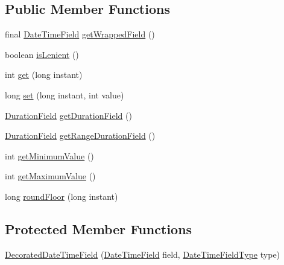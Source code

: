 \subsection*{Public Member Functions}
\begin{DoxyCompactItemize}
\item 
final \hyperlink{classorg_1_1joda_1_1time_1_1_date_time_field}{Date\-Time\-Field} \hyperlink{classorg_1_1joda_1_1time_1_1field_1_1_decorated_date_time_field_aa57cf514485795da7b838d0c8986c545}{get\-Wrapped\-Field} ()
\item 
boolean \hyperlink{classorg_1_1joda_1_1time_1_1field_1_1_decorated_date_time_field_a6123c943d6b22028bd8b2e808929369c}{is\-Lenient} ()
\item 
int \hyperlink{classorg_1_1joda_1_1time_1_1field_1_1_decorated_date_time_field_a16c65d5fd974660e6f23ad75261ee51f}{get} (long instant)
\item 
long \hyperlink{classorg_1_1joda_1_1time_1_1field_1_1_decorated_date_time_field_a2c48e6d5c609215a6b33049feb869f7a}{set} (long instant, int value)
\item 
\hyperlink{classorg_1_1joda_1_1time_1_1_duration_field}{Duration\-Field} \hyperlink{classorg_1_1joda_1_1time_1_1field_1_1_decorated_date_time_field_aaf9740f64287368d141a9b6945d3c7f4}{get\-Duration\-Field} ()
\item 
\hyperlink{classorg_1_1joda_1_1time_1_1_duration_field}{Duration\-Field} \hyperlink{classorg_1_1joda_1_1time_1_1field_1_1_decorated_date_time_field_a93faaa98152ca549bb9095280262ed40}{get\-Range\-Duration\-Field} ()
\item 
int \hyperlink{classorg_1_1joda_1_1time_1_1field_1_1_decorated_date_time_field_a06833850ac8650f7f7cad7670b1365c3}{get\-Minimum\-Value} ()
\item 
int \hyperlink{classorg_1_1joda_1_1time_1_1field_1_1_decorated_date_time_field_a0c31921960fa2402e42f292dd09d5c08}{get\-Maximum\-Value} ()
\item 
long \hyperlink{classorg_1_1joda_1_1time_1_1field_1_1_decorated_date_time_field_a900b454e29332973f15ce88e34774878}{round\-Floor} (long instant)
\end{DoxyCompactItemize}
\subsection*{Protected Member Functions}
\begin{DoxyCompactItemize}
\item 
\hyperlink{classorg_1_1joda_1_1time_1_1field_1_1_decorated_date_time_field_a11b54f8b7c2de1a152e558dab97af3fe}{Decorated\-Date\-Time\-Field} (\hyperlink{classorg_1_1joda_1_1time_1_1_date_time_field}{Date\-Time\-Field} field, \hyperlink{classorg_1_1joda_1_1time_1_1_date_time_field_type}{Date\-Time\-Field\-Type} type)
\end{DoxyCompactItemize}


